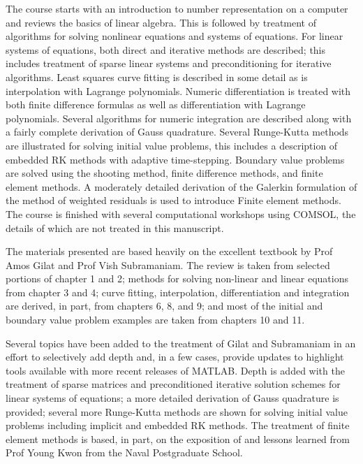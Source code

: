 \documentclass{tufte-book}
\theoremstyle{break}
\begin{document}
The course starts with an introduction to number representation on a computer and reviews the basics of linear algebra.  This is followed by treatment of algorithms for solving nonlinear equations and systems of equations.  For linear systems of equations, both direct and iterative methods are described; this includes treatment of sparse linear systems and preconditioning for iterative algorithms.  Least squares curve fitting is described in some detail as is interpolation with Lagrange polynomials.  Numeric differentiation is treated with both finite difference formulas as well as differentiation with Lagrange polynomials.  Several algorithms for numeric integration are described along with a fairly complete derivation of Gauss quadrature.  Several Runge-Kutta methods are illustrated for solving initial value problems, this includes a description of embedded RK methods with adaptive time-stepping.  Boundary value problems are solved using the shooting method, finite difference methods, and finite element methods.  A moderately detailed derivation of the Galerkin formulation of the method of weighted residuals is used to introduce Finite element methods.  The course is finished with several computational workshops using COMSOL, the details of which are not treated in this manuscript. 

The materials presented are based heavily on the excellent textbook by Prof Amos Gilat and Prof Vish Subramaniam.\cite{gilat}  The review is taken from selected portions of chapter 1 and 2; methods for solving non-linear and linear equations from chapter 3 and 4; curve fitting, interpolation, differentiation and integration are derived, in part, from chapters 6, 8, and 9; and most of the initial and boundary value problem examples are taken from chapters 10 and 11.

Several topics have been added to the treatment of Gilat and Subramaniam in an effort to selectively add depth and, in a few cases, provide updates to highlight tools available with more recent releases of MATLAB.  Depth is added with the treatment of sparse matrices and preconditioned iterative solution schemes for linear systems of equations; a more detailed derivation of Gauss quadrature is provided; several more Runge-Kutta methods are shown for solving initial value problems including implicit and embedded RK methods.  The treatment of finite element methods is based, in part, on the exposition of and lessons learned from Prof Young Kwon from the Naval Postgraduate School.\cite{kwon2018finite} 
\end{document}
